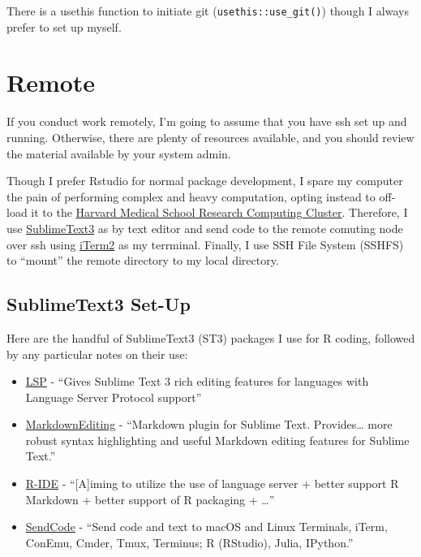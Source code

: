 \documentclass[]{book}
\providecommand{\tightlist}{%
  \setlength{\itemsep}{0pt}\setlength{\parskip}{0pt}}
\begin{document}
There is a usethis function to initiate git (\texttt{usethis::use\_git()}) though I always prefer to set up myself.

\hypertarget{remote}{%
\section{Remote}\label{remote}}

If you conduct work remotely, I'm going to assume that you have ssh set up and running. Otherwise, there are plenty of resources available, and you should review the material available by your system admin.

Though I prefer Rstudio for normal package development, I spare my computer the pain of performing complex and heavy computation, opting instead to off-load it to the \href{https://rc.hms.harvard.edu}{Harvard Medical School Research Computing Cluster}. Therefore, I use \href{https://www.sublimetext.com}{SublimeText3} as by text editor and send code to the remote comuting node over ssh using \href{https://iterm2colorschemes.com}{iTerm2} as my terrminal. Finally, I use SSH File System (SSHFS) to ``mount'' the remote directory to my local directory.

\hypertarget{sublimetext3-set-up}{%
\subsection{SublimeText3 Set-Up}\label{sublimetext3-set-up}}

Here are the handful of SublimeText3 (ST3) packages I use for R coding, followed by any particular notes on their use:

\begin{itemize}
\tightlist
\item
  \href{https://packagecontrol.io/packages/LSP}{LSP} - ``Gives Sublime Text 3 rich editing features for languages with Language Server Protocol support''
\item
  \href{https://packagecontrol.io/packages/MarkdownEditing}{MarkdownEditing} - ``Markdown plugin for Sublime Text. Provides\ldots{} more robust syntax highlighting and useful Markdown editing features for Sublime Text.''
\item
  \href{https://packagecontrol.io/packages/R-IDE}{R-IDE} - ``{[}A{]}iming to utilize the use of language server + better support R Markdown + better support of R packaging + \ldots{}''
\item
  \href{https://packagecontrol.io/packages/SendCode}{SendCode} - ``Send code and text to macOS and Linux Terminals, iTerm, ConEmu, Cmder, Tmux, Terminus; R (RStudio), Julia, IPython.''
\end{itemize}
\end{document}
